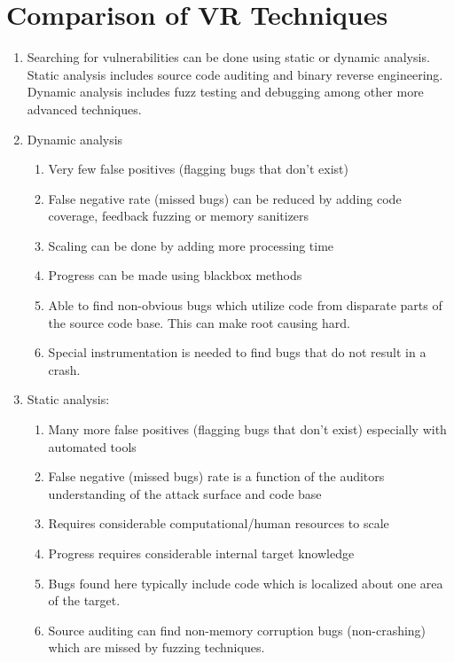 \documentclass[12pt]{Training}
\begin{document}
\section*{Comparison of VR Techniques}
\begin{enumerate}
	\item Searching for vulnerabilities can be done using static or dynamic analysis. Static analysis includes source code auditing and binary reverse engineering. Dynamic analysis includes fuzz testing and debugging among other more advanced techniques.
	\item Dynamic analysis
		\begin{enumerate}
			\item Very few false positives (flagging bugs that don't exist)
			\item False negative rate (missed bugs) can be reduced by adding code coverage, feedback fuzzing or memory sanitizers
			\item Scaling can be done by adding more processing time
			\item Progress can be made using blackbox methods
			\item Able to find non-obvious bugs which utilize code from disparate parts of the source code base. This can make root causing hard.
			\item Special instrumentation is needed to find bugs that do not result in a crash.
		\end{enumerate}
	\item Static analysis:
		\begin{enumerate}
			\item Many more false positives (flagging bugs that don't exist) especially with automated tools
			\item False negative (missed bugs) rate is a function of the auditors understanding of the attack surface and code base
			\item Requires considerable computational/human resources to scale
			\item Progress requires considerable internal target knowledge
			\item Bugs found here typically include code which is localized about one area of the target. 
			\item Source auditing can find non-memory corruption bugs (non-crashing) which are missed by fuzzing techniques.
		\end{enumerate}
\end{enumerate}
\end{document}
